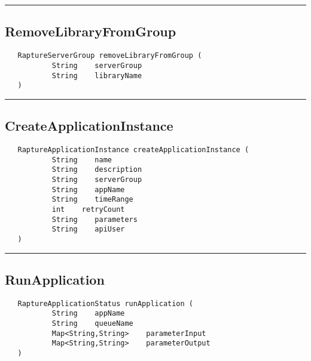 \rule{15cm}{2pt}
\subsection{RemoveLibraryFromGroup}
\label{Api:RemoveLibraryFromGroup}
\begin{verbatim}
   RaptureServerGroup removeLibraryFromGroup (
           String    serverGroup
           String    libraryName
   )
\end{verbatim}



\rule{15cm}{2pt}
\subsection{CreateApplicationInstance}
\label{Api:CreateApplicationInstance}
\begin{verbatim}
   RaptureApplicationInstance createApplicationInstance (
           String    name
           String    description
           String    serverGroup
           String    appName
           String    timeRange
           int    retryCount
           String    parameters
           String    apiUser
   )
\end{verbatim}



\rule{15cm}{2pt}
\subsection{RunApplication}
\label{Api:RunApplication}
\begin{verbatim}
   RaptureApplicationStatus runApplication (
           String    appName
           String    queueName
           Map<String,String>    parameterInput
           Map<String,String>    parameterOutput
   )
\end{verbatim}



